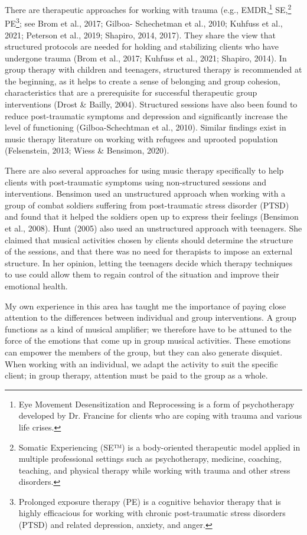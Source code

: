 \documentclass[authordate, empirical, issue]{jote-new-article}
\begin{document}
There are therapeutic approaches for working with trauma (e.g., EMDR,\footnote{Eye Movement Desensitization and Reprocessing is a form of psychotherapy developed by Dr. Francine for clients who are coping with trauma and various life crises.} SE,\footnote{ Somatic Experiencing (SE™) is a body-oriented therapeutic model applied in multiple professional settings such as psychotherapy, medicine, coaching, teaching, and physical therapy while working with trauma and other stress disorders.} PE\footnote{ Prolonged exposure therapy (PE) is a cognitive behavior therapy that is highly efficacious for working with chronic post-traumatic stress disorders (PTSD) and related depression, anxiety, and anger.}; see Brom et al., 2017; Gilboa- Schechetman et al., 2010; Kuhfuss et al., 2021; Peterson et al., 2019; Shapiro, 2014, 2017). They share the view that structured protocols are needed for holding and stabilizing clients who have undergone trauma (Brom et al., 2017; Kuhfuss et al., 2021; Shapiro, 2014). In group therapy with children and teenagers, structured therapy is recommended at the beginning, as it helps to create a sense of belonging and group cohesion, characteristics that are a prerequisite for successful therapeutic group interventions (Drost \& Bailly, 2004). Structured sessions have also been found to reduce post-traumatic symptoms and depression and significantly increase the level of functioning (Gilboa-Schechtman et al., 2010). Similar findings exist in music therapy literature on working with refugees and uprooted population (Felsenstein, 2013; Wiess \& Bensimon, 2020).



There are also several approaches for using music therapy specifically to help clients with post-traumatic symptoms using non-structured sessions and interventions. Bensimon used an unstructured approach when working with a group of combat soldiers suffering from post-traumatic stress disorder (PTSD) and found that it helped the soldiers open up to express their feelings (Bensimon et al., 2008). Hunt (2005) also used an unstructured approach with teenagers. She claimed that musical activities chosen by clients should determine the structure of the sessions, and that there was no need for therapists to impose an external structure. In her opinion, letting the teenagers decide which therapy techniques to use could allow them to regain control of the situation and improve their emotional health.



My own experience in this area has taught me the importance of paying close attention to the differences between individual and group interventions. A group functions as a kind of musical amplifier; we therefore have to be attuned to the force of the emotions that come up in group musical activities. These emotions can empower the members of the group, but they can also generate disquiet. When working with an individual, we adapt the activity to suit the specific client; in group therapy, attention must be paid to the group as a whole.
\end{document}
